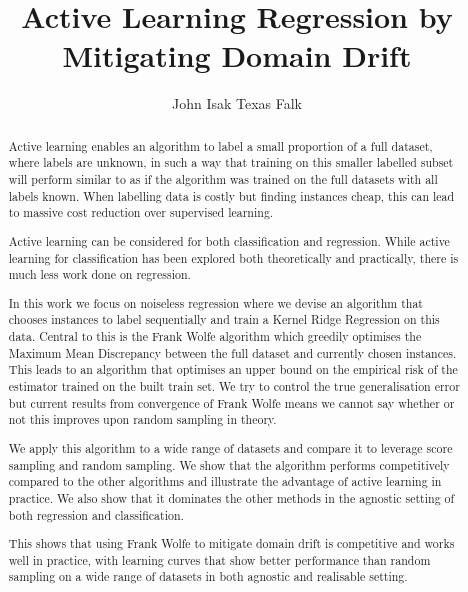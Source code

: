 
\title{Active Learning Regression by Mitigating Domain Drift}
\author{John Isak Texas Falk}

\maketitle
\makedeclaration

\begin{abstract} %
  Active learning enables an algorithm to label a small proportion of a full
  dataset, where labels are unknown, in such a way that training on this smaller
  labelled subset will perform similar to as if the algorithm was trained on the
  full datasets with all labels known. When labelling data is costly but finding
  instances cheap, this can lead to massive cost reduction over supervised
  learning.

  Active learning can be considered for both classification and regression.
  While active learning for classification has been explored both theoretically
  and practically, there is much less work done on regression.

  In this work we focus on noiseless regression where we devise an algorithm
  that chooses instances to label sequentially and train a Kernel Ridge Regression
  on this data. Central to this is the Frank Wolfe algorithm which greedily
  optimises the Maximum Mean Discrepancy between the full dataset and currently
  chosen instances. This leads to an algorithm that optimises an upper bound on
  the empirical risk of the estimator trained on the built train set. We try to
  control the true generalisation error but current results from convergence of
  Frank Wolfe means we cannot say whether or not this improves upon random
  sampling in theory.

  We apply this algorithm to a wide range of datasets and compare it to leverage
  score sampling and random sampling. We show that the algorithm performs
  competitively compared to the other algorithms and illustrate the advantage of active
  learning in practice. We also show that it dominates the other methods in the
  agnostic setting of both regression and classification.

  This shows that using Frank Wolfe to mitigate domain drift is competitive and
  works well in practice, with learning curves that show better performance
  than random sampling on a wide range of datasets in both agnostic and
  realisable setting.
\end{abstract}

